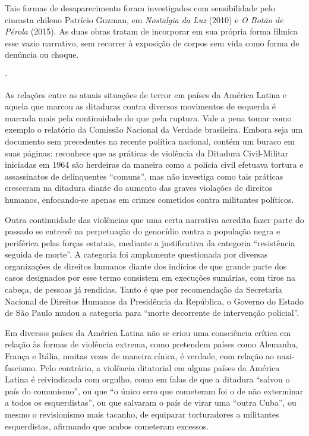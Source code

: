 Tais formas de desaparecimento foram investigados com sensibilidade pelo
cineasta chileno Patrício Guzman, em \emph{Nostalgia da Luz} (2010) e
\emph{O Botão de Pérola} (2015). As duas obras tratam de incorporar em
sua própria forma fílmica esse vazio narrativo, sem recorrer à exposição
de corpos sem vida como forma de denúncia ou choque.

-

As relações entre as atuais situações de terror em países da América
Latina e aquela que marcou as ditaduras contra diversos movimentos de
esquerda é marcada mais pela continuidade do que pela ruptura. Vale a
pena tomar como exemplo o relatório da Comissão Nacional da Verdade
brasileira. Embora seja um documento sem precedentes na recente política
nacional, contém um buraco em suas páginas: reconhece que as práticas de
violência da Ditadura Civil-Militar iniciadas em 1964 são herdeiras da
maneira como a polícia civil efetuava tortura e assassinatos de
delinquentes ``comuns'', mas não investiga como tais práticas cresceram
na ditadura diante do aumento das graves violações de direitos humanos,
enfocando-se apenas em crimes cometidos contra militantes políticos.

Outra continuidade das violências que uma certa narrativa acredita fazer
parte do passado se entrevê na perpetuação do genocídio contra a
população negra e periférica pelas forças estatais, mediante a
justificativa da categoria ``resistência seguida de morte''. A categoria
foi amplamente questionada por diversas organizações de direitos humanos
diante dos indícios de que grande parte dos casos designados por esse
termo consistem em execuções sumárias, com tiros na cabeça, de pessoas
já rendidas. Tanto é que por recomendação da Secretaria Nacional de
Direitos Humanos da Presidência da República, o Governo do Estado de São
Paulo mudou a categoria para ``morte decorrente de intervenção
policial''.

Em diversos países da América Latina não se criou uma consciência
crítica em relação às formas de violência extrema, como pretendem países
como Alemanha, França e Itália, muitas vezes de maneira cínica, é
verdade, com relação ao nazi-fascismo. Pelo contrário, a violência
ditatorial em alguns países da América Latina é reivindicada com
orgulho, como em falas de que a ditadura ``salvou o país do comunismo'',
ou que ``o único erro que cometeram foi o de não exterminar a todos os
esquerdistas'', ou que salvaram o país de virar uma ``outra Cuba'', ou
mesmo o revisionismo mais tacanho, de equiparar torturadores a
militantes esquerdistas, afirmando que ambos cometeram excessos.

